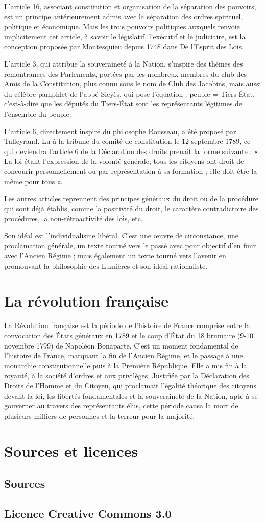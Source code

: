 \documentclass[a4paper,10pt]{book}
\begin{document}
L'article 16, associant constitution et organisation de la séparation des pouvoirs, est un principe antérieurement admis avec la séparation des ordres spirituel, politique et économique. Mais les trois pouvoirs politiques auxquels renvoie implicitement cet article, à savoir le législatif, l'exécutif et le judiciaire, est la conception proposée par Montesquieu depuis 1748 dans De l'Esprit des Lois.

L'article 3, qui attribue la souveraineté à la Nation, s'inspire des thèmes des remontrances des Parlements, portées par les nombreux membres du club des Amis de la Constitution, plus connu sous le nom de Club des Jacobins, mais aussi du célèbre pamphlet de l'abbé Sieyès, qui pose l'équation : peuple = Tiers-État, c'est-à-dire que les députés du Tiers-État sont les représentants légitimes de l'ensemble du peuple.

L'article 6, directement inspiré du philosophe Rousseau, a été proposé par Talleyrand. Lu à la tribune du comité de constitution le 12 septembre 1789, ce qui deviendra l'article 6 de la Déclaration des droits prenait la forme suivante : « La loi étant l'expression de la volonté générale, tous les citoyens ont droit de concourir personnellement ou par représentation à sa formation ; elle doit être la même pour tous ».

Les autres articles reprennent des principes généraux du droit ou de la procédure qui sont déjà établis, comme la positivité du droit, le caractère contradictoire des procédures, la non-rétroactivité des lois, etc.

Son idéal est l'individualisme libéral. C'est une œuvre de circonstance, une proclamation générale, un texte tourné vers le passé avec pour objectif d'en finir avec l'Ancien Régime ; mais également un texte tourné vers l'avenir en promouvant la philosophie des Lumières et son idéal rationaliste.

\appendix
\chapter{La révolution française}
La Révolution française est la période de l'histoire de France comprise entre la convocation des États généraux en 1789 et le coup d'État du 18 brumaire (9-10 novembre 1799) de Napoléon Bonaparte. C'est un moment fondamental de l'histoire de France, marquant la fin de l'Ancien Régime, et le passage à une monarchie constitutionnelle puis à la Première République. Elle a mis fin à la royauté, à la société d'ordres et aux privilèges. Justifiée par la Déclaration des Droits de l'Homme et du Citoyen, qui proclamait l'égalité théorique des citoyens devant la loi, les libertés fondamentales et la souveraineté de la Nation, apte à se gouverner au travers des représentants élus, cette période causa la mort de plusieurs milliers de personnes et la terreur pour la majorité.

\backmatter
\chapter{Sources et licences}
\section*{Sources}

\section*{Licence Creative Commons 3.0}
\end{document}
